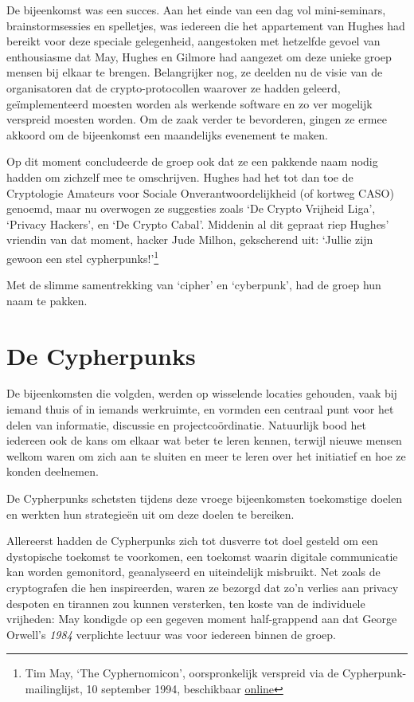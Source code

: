 \documentclass[
  a5paper,
  smalldemyvopaper,11pt,twoside,onecolumn,openright,extrafontsizes]{memoir}
\begin{document}
De bijeenkomst was een succes. Aan het einde van een dag vol
mini-seminars, brainstormsessies en spelletjes, was iedereen die het
appartement van Hughes had bereikt voor deze speciale gelegenheid,
aangestoken met hetzelfde gevoel van enthousiasme dat May, Hughes en
Gilmore had aangezet om deze unieke groep mensen bij elkaar te brengen.
Belangrijker nog, ze deelden nu de visie van de organisatoren dat de
crypto-protocollen waarover ze hadden geleerd, geïmplementeerd moesten
worden als werkende software en zo ver mogelijk verspreid moesten
worden. Om de zaak verder te bevorderen, gingen ze ermee akkoord om de
bijeenkomst een maandelijks evenement te maken.

Op dit moment concludeerde de groep ook dat ze een pakkende naam nodig
hadden om zichzelf mee te omschrijven. Hughes had het tot dan toe de
Cryptologie Amateurs voor Sociale Onverantwoordelijkheid (of kortweg
CASO) genoemd, maar nu overwogen ze suggesties zoals `De Crypto Vrijheid
Liga', `Privacy Hackers', en `De Crypto Cabal'. Middenin al dit gepraat
riep Hughes' vriendin van dat moment, hacker Jude Milhon, gekscherend
uit: `Jullie zijn gewoon een stel cypherpunks!'\footnote{Tim May, `The
  Cyphernomicon', oorspronkelijk verspreid via de
  Cypherpunk-mailinglijst, 10 september 1994, beschikbaar
  \href{https://cdn.nakamotoinstitute.org/docs/cyphernomicon.txt}{online}}

Met de slimme samentrekking van `cipher' en `cyberpunk', had de groep
hun naam te pakken.

\section{De Cypherpunks}\label{de-cypherpunks}

De bijeenkomsten die volgden, werden op wisselende locaties gehouden,
vaak bij iemand thuis of in iemands werkruimte, en vormden een centraal
punt voor het delen van informatie, discussie en projectcoördinatie.
Natuurlijk bood het iedereen ook de kans om elkaar wat beter te leren
kennen, terwijl nieuwe mensen welkom waren om zich aan te sluiten en
meer te leren over het initiatief en hoe ze konden deelnemen.

De Cypherpunks schetsten tijdens deze vroege bijeenkomsten toekomstige
doelen en werkten hun strategieën uit om deze doelen te bereiken.

Allereerst hadden de Cypherpunks zich tot dusverre tot doel gesteld om
een dystopische toekomst te voorkomen, een toekomst waarin digitale
communicatie kan worden gemonitord, geanalyseerd en uiteindelijk
misbruikt. Net zoals de cryptografen die hen inspireerden, waren ze
bezorgd dat zo'n verlies aan privacy despoten en tirannen zou kunnen
versterken, ten koste van de individuele vrijheden: May kondigde op een
gegeven moment half-grappend aan dat George Orwell's \emph{1984}
verplichte lectuur was voor iedereen binnen de groep.
\end{document}
